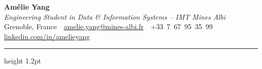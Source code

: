 \documentclass[10.5pt,a4paper]{article}
\begin{document}
\begin{center}
  {\fontsize{26}{30}\selectfont\bfseries Amélie Yang}\\[4pt]
  {\color{accent}\itshape\large Engineering Student in Data \& Information Systems -- IMT Mines Albi}\\[6pt]
  {\small
    Grenoble, France
    \,\textbullet\,
    \href{mailto:amelie.yang@mines-albi.fr}{amelie.yang@mines-albi.fr}
    \,\textbullet\,
    +33~7~67~95~35~99
    \,\textbullet\,
    \href{https://www.linkedin.com/in/amelieyang}{linkedin.com/in/amelieyang}
  }
\end{center}

\vspace{3pt}
{\color{accent}\hrule height 1.2pt}
\vspace{4pt}
\end{document}

